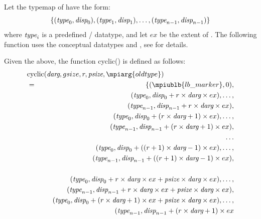 \noindent Let the typemap of  have the form:
\begin{displaymath}
\{(\textrm{\itshape{type}}_0,\textrm{\itshape{disp}}_0),(\textrm{\itshape{type}}_1,\textrm{\itshape{disp}}_1),\ldots,(\textrm{\itshape{type}}_{n-1},\textrm{\itshape{disp}}_{n-1})\}
\end{displaymath}
where $\textrm{\itshape{type}}_i$ is a predefined \MPI/ datatype, and let $ex$ be the
extent of .
The following function uses the conceptual datatypes 
and , see  for details.

Given the above, the function cyclic() is defined as follows:
\begin{eqnarray*}
\lefteqn{\mbox{cyclic}(\mword{darg}, gsize, r, \mword{psize}, \mpiarg{oldtype})} \\
&=& \{ (\mpiublb{lb\_marker}, 0), \\
& &  (\mword{type}_0, \mword{disp}_0 + r \times \mword{darg} \times ex), \ldots , \\
& & \hspace{.5in}  (\mword{type}_{n-1}, \mword{disp}_{n-1} + r \times \mword{darg} \times ex), \\
& &  (\mword{type}_0, \mword{disp}_0 + (r \times \mword{darg} + 1) \times ex), \ldots , \\
& & \hspace{.5in} (\mword{type}_{n-1}, \mword{disp}_{n-1} + (r \times \mword{darg} + 1)\times ex), \\
& & \ldots \\
& &  (\mword{type}_0, \mword{disp}_0 + ((r+1) \times \mword{darg} -1) \times ex), \ldots , \\
& & \hspace{.5in} (\mword{type}_{n-1}, \mword{disp}_{n-1} + ((r+1)
                        \times \mword{darg} - 1)\times ex), \\
& & \\
& &  (\mword{type}_0, \mword{disp}_0 + r \times \mword{darg} \times ex + \mword{psize} \times \mword{darg} \times ex),
        \ldots , \\
& & \hspace{.5in} (\mword{type}_{n-1}, \mword{disp}_{n-1} + r \times \mword{darg} \times ex
                + \mword{psize} \times \mword{darg} \times ex), \\
& &  (\mword{type}_0, \mword{disp}_0 + (r \times \mword{darg} + 1) \times ex
         + \mword{psize} \times \mword{darg} \times ex),
        \ldots , \\
& & \hspace{.5in} (\mword{type}_{n-1}, \mword{disp}_{n-1} + (r \times \mword{darg} + 1) \times ex

\end{eqnarray*}
